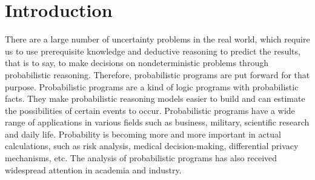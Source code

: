 \documentclass[sigconf,review, anonymous]{acmart}
\newcommand\leaveout[1]{}
\begin{document}
\leaveout{
%
%
\begin{CCSXML}
<ccs2012>
 <concept>
  <concept_id>10010520.10010553.10010562</concept_id>
  <concept_desc>Computer systems organization~Embedded systems</concept_desc>
  <concept_significance>500</concept_significance>
 </concept>
 <concept>
  <concept_id>10010520.10010575.10010755</concept_id>
  <concept_desc>Computer systems organization~Redundancy</concept_desc>
  <concept_significance>300</concept_significance>
 </concept>
 <concept>
  <concept_id>10010520.10010553.10010554</concept_id>
  <concept_desc>Computer systems organization~Robotics</concept_desc>
  <concept_significance>100</concept_significance>
 </concept>
 <concept>
  <concept_id>10003033.10003083.10003095</concept_id>
  <concept_desc>Networks~Network reliability</concept_desc>
  <concept_significance>100</concept_significance>
 </concept>
</ccs2012>  
\end{CCSXML}
}





\maketitle


\section{Introduction}
There are a large number of uncertainty problems in the real world, which require us to use prerequisite knowledge and deductive reasoning to predict the results, that is to say, to make decisions on nondeterministic problems through probabilistic reasoning. Therefore, probabilistic programs are put forward for that purpose. Probabilistic programs are a kind of logic programs with probabilistic facts. They make probabilistic reasoning models easier to build and can estimate the possibilities of certain events to occur.
Probabilistic programs have a wide range of applications in various fields such as business, military, scientific research and daily life. Probability is becoming more and more important in actual calculations, such as risk analysis, medical decision-making, differential privacy mechanisms, etc. The analysis of probabilistic programs has also received widespread attention in academia and industry. %
\end{document}
